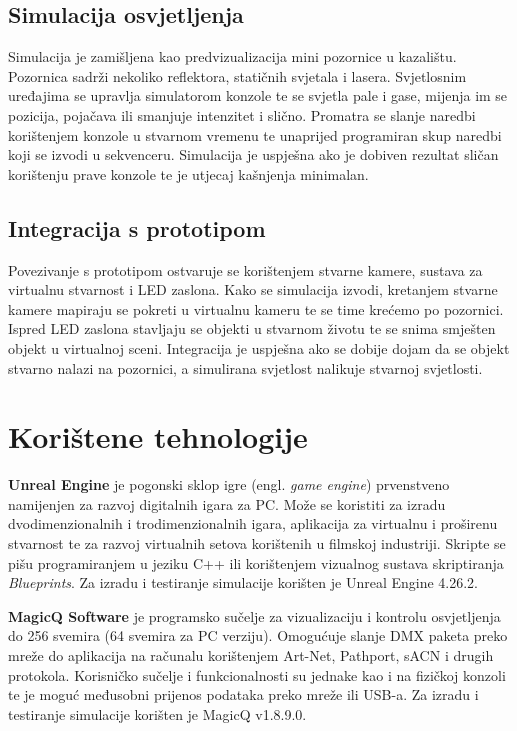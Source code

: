 \documentclass[times, utf8, zavrsni, numeric]{fer}
\begin{document}
\section{Simulacija osvjetljenja}
Simulacija je zamišljena kao predvizualizacija mini pozornice u kazalištu. Pozornica sadrži nekoliko reflektora, statičnih svjetala i lasera. Svjetlosnim uređajima se upravlja simulatorom konzole te se svjetla pale i gase, mijenja im se pozicija, pojačava ili smanjuje intenzitet i slično. Promatra se slanje naredbi korištenjem konzole u stvarnom vremenu te unaprijed programiran skup naredbi koji se izvodi u sekvenceru. Simulacija je uspješna ako je dobiven rezultat sličan korištenju prave konzole te je utjecaj kašnjenja minimalan.

\section{Integracija s prototipom}
Povezivanje s prototipom ostvaruje se korištenjem stvarne kamere, sustava za virtualnu stvarnost i LED zaslona. Kako se simulacija izvodi, kretanjem stvarne kamere mapiraju se pokreti u virtualnu kameru te se time krećemo po pozornici. Ispred LED zaslona stavljaju se objekti u stvarnom životu te se snima smješten objekt u virtualnoj sceni. Integracija je uspješna ako se dobije dojam da se objekt stvarno nalazi na pozornici, a simulirana svjetlost nalikuje stvarnoj svjetlosti.

\chapter{Korištene tehnologije}
\textbf{Unreal Engine} \cite{Unreal_Engine} je pogonski sklop igre (engl. \emph{game engine}) prvenstveno namijenjen za razvoj digitalnih igara za PC. Može se koristiti za izradu dvodimenzionalnih i trodimenzionalnih igara, aplikacija za virtualnu i proširenu stvarnost te za razvoj virtualnih setova korištenih u filmskoj industriji. Skripte se pišu programiranjem u jeziku C++ ili korištenjem vizualnog sustava skriptiranja \emph{Blueprints}. 
Za izradu i testiranje simulacije korišten je Unreal Engine 4.26.2.\newline

\textbf{MagicQ Software} \cite{MagicQ_Software} je programsko sučelje za vizualizaciju i kontrolu osvjetljenja do 256 svemira (64 svemira za PC verziju). Omogućuje slanje DMX paketa preko mreže do aplikacija na računalu korištenjem Art-Net, Pathport, sACN i drugih protokola. Korisničko sučelje i funkcionalnosti su jednake kao i na fizičkoj konzoli te je moguć međusobni prijenos podataka preko mreže ili USB-a. 
Za izradu i  testiranje simulacije korišten je MagicQ v1.8.9.0.\newline
\end{document}
